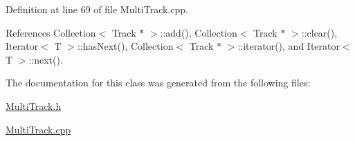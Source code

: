 Definition at line 69 of file Multi\-Track.cpp.

References Collection$<$ Track $\ast$ $>$::add(), Collection$<$ Track $\ast$ $>$::clear(), Iterator$<$ T $>$::has\-Next(), Collection$<$ Track $\ast$ $>$::iterator(), and Iterator$<$ T $>$::next().

The documentation for this class was generated from the following files:\begin{CompactItemize}
\item 
\hyperlink{MultiTrack_8h}{Multi\-Track.h}\item 
\hyperlink{MultiTrack_8cpp}{Multi\-Track.cpp}\end{CompactItemize}
